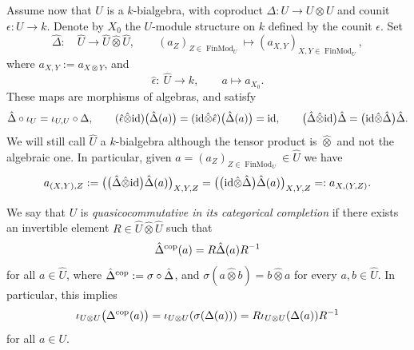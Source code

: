 \documentclass[pdftex]{sigma}%
\numberwithin{equation}{section}
\numberwithin{figure}{section}
\begin{document}
Assume now that $U$ is a $k$-bialgebra, with coproduct $\Delta\colon U\to U\otimes U$ and counit $\epsilon\colon U\to k$. Denote by $X_0$ the $U$-module structure on $k$ defined by the counit $\epsilon$. Set
\[
\hat{\Delta}\colon \quad \hat{U}\to \hat{U}\hat{\otimes} \hat{U},\qquad (a_{Z})_{Z\in \operatorname{FinMod}_{U}}\mapsto (a_{X,Y})_{X,Y\in \operatorname{FinMod}_{U}},
\]
where $a_{X,Y}:=a_{X\otimes Y}$, and
\[
\hat{\epsilon}\colon \ \hat{U}\rightarrow k, \qquad a\mapsto a_{X_0}.
\]
These maps are morphisms of algebras, and satisfy
\[
\hat{\Delta}\circ\iota_{U}=\iota_{U,U}\circ \Delta ,\qquad (\hat{\epsilon}\hat{\otimes} {\rm id})\big(\hat{\Delta}(a)\big)=({\rm id}\hat{\otimes} \hat{\epsilon})\big(\hat{\Delta}(a)\big)={\rm id}, \qquad \big(\hat{\Delta}\hat{\otimes} {\rm id}\big)\hat{\Delta}=\big({\rm id}\hat{\otimes} \hat{\Delta}\big)\hat{\Delta}.
\]
We will still call $\hat{U}$ a $k$-bialgebra although the tensor product is $\hat{\otimes} $ and not the algebraic one. In particular, given $a=(a_{Z})_{Z\in \operatorname{FinMod}_{U}}\in \hat{U}$ we have
\[
a_{(X,Y),Z}:=\big(\big(\hat{\Delta}\hat{\otimes} {\rm id}\big)\hat{\Delta}(a)\big)_{X,Y,Z} = \big(\big({\rm id}\hat{\otimes} \hat{\Delta}\big)\hat{\Delta}(a)\big)_{X,Y,Z}=: a_{X,(Y,Z)}.
\]

We say that $U$ is {\it quasicocommutative in its categorical completion} if there exists an invertible element $R\in \hat{U}\hat{\otimes} \hat{U}$ such that
\[
\hat{\Delta}^{\rm cop}(a) = R\hat{\Delta}(a)R^{-1}
\]
for all $a\in \hat{U}$, where $\hat{\Delta}^{\rm cop} := \sigma\circ \hat{\Delta}$, and $\sigma(a\hat{\otimes} b) = b\hat{\otimes} a$ for every $a,b\in \hat{U}$. In particular, this implies
\[
\iota_{U\otimes U}\big( \Delta^{\rm cop}(a)\big)=\iota_{U\otimes U}(\sigma(\Delta(a)))=R\iota_{U\otimes U}(\Delta(a))R^{-1}
\]
for all $a\in U$.
\end{document}
